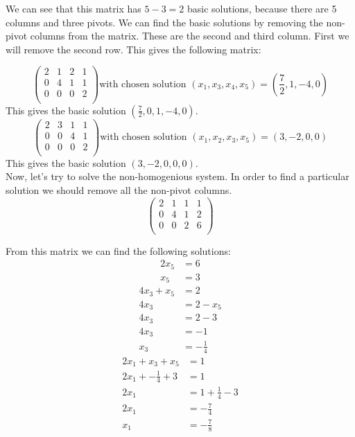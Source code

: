 \documentclass[a4paper]{article}
\begin{document}
We can see that this matrix has $5 - 3 = 2$ basic solutions, because there are 5 columns and three pivots. We can find the basic solutions by removing the non-pivot columns from the matrix. These are the second and third column. First we will remove the second row. This gives the following matrix:

\[
\left(
\begin{array}{cccc}
2 & 1 & 2 & 1   \\
0 & 4 & 1 & 1  \\
0 & 0 & 0 & 2 \\
\end{array}
\right)
\text{with chosen solution $(x_1, x_3, x_4, x_5) = (\frac{7}{2}, 1, -4, 0)$}
\]
This gives the basic solution $(\frac{7}{2}, 0, 1, -4, 0)$.
\[
\left(
\begin{array}{cccc}
2 & 3 & 1 & 1   \\
0 & 0 & 4 & 1  \\
0 & 0 & 0 & 2 \\
\end{array}
\right)
\text{with chosen solution $(x_1, x_2, x_3, x_5) = (3, -2, 0, 0)$}
\]
This gives the basic solution $(3, -2, 0, 0, 0)$. \\
Now, let's try to solve the non-homogenious system. In order to find a particular solution we should remove all the non-pivot columns.
\[
\left(
\begin{array}{ccc|c}
2 & 1 & 1 & 1   \\
0 & 4 & 1 & 2  \\
0 & 0 & 2 & 6 \\
\end{array}
\right)
\]

From this matrix we can find the following solutions:
\begin{align*}
  2x_5 &= 6 \\
  x_5 &= 3
\end{align*}
\begin{align*}
  4x_3 + x_5 &= 2 \\
  4x_3 &= 2 - x_5 \\
  4x_3 &= 2 - 3 \\
  4x_3 &= -1 \\
  x_3 &= - \frac{1}{4}
\end{align*}
\begin{align*}
  2x_1 + x_3 + x_5 &= 1 \\
  2x_1 + - \frac{1}{4} + 3 &= 1 \\
  2x_1 &= 1 + \frac{1}{4} - 3 \\
  2x_1 &= - \frac{7}{4} \\
  x_1 &= - \frac{7}{8}
\end{align*}
\end{document}
